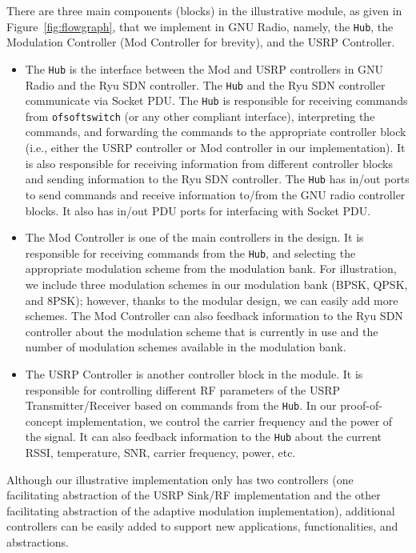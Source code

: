 There are three main components (blocks) in the illustrative \crossflow module, as given in Figure~\ref{fig:flowgraph}, that we implement in GNU Radio, namely, the \texttt{\crossflow Hub}, the Modulation Controller (Mod Controller for brevity), and the USRP Controller.
\begin{itemize}
\item The \texttt{\crossflow Hub} is the interface between the Mod and USRP controllers in GNU Radio and the Ryu SDN controller. The \texttt{\crossflow Hub} and the Ryu SDN controller communicate via Socket PDU. The \texttt{\crossflow Hub} is responsible for receiving commands from \texttt{ofsoftswitch} (or any other compliant interface), interpreting the commands, and forwarding the commands to the appropriate controller block (i.e., either the USRP controller or Mod controller in our implementation). It is also responsible for receiving information from different controller blocks and sending information to the Ryu SDN controller. The \texttt{\crossflow Hub} has in/out ports to send commands and receive information to/from the GNU radio controller blocks. It also has in/out PDU ports for interfacing with Socket PDU.
\item The Mod Controller is one of the main controllers in the design. It is responsible for receiving commands from the \texttt{\crossflow Hub}, and selecting the appropriate modulation scheme from the modulation bank. For illustration, we include three modulation schemes in our modulation bank (BPSK, QPSK, and 8PSK); however, thanks to the modular design, we can easily add more schemes. The Mod Controller can also feedback information to the Ryu SDN controller about the modulation scheme that is currently in use and the number of modulation schemes available in the modulation bank.
\item The USRP Controller is another controller block in the \crossflow module. It is responsible for controlling different RF parameters of the USRP Transmitter/Receiver based on commands from the \texttt{\crossflow Hub}. In our proof-of-concept implementation, we control the carrier frequency and the power of the signal. It can also feedback information to the \texttt{\crossflow Hub} about the current RSSI, temperature, SNR, carrier frequency, power, etc.
\end{itemize}
Although our illustrative implementation only has two controllers (one facilitating abstraction of the USRP Sink/RF implementation and the other facilitating abstraction of the adaptive modulation implementation), additional controllers can be easily added to support new applications, functionalities, and abstractions.

